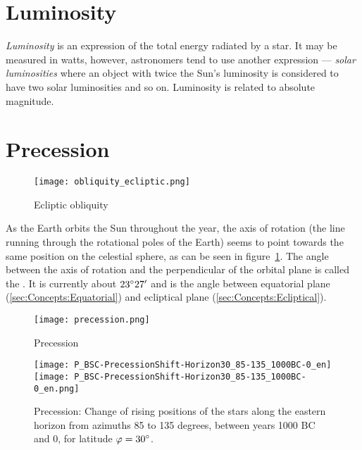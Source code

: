 \section{Luminosity}
\label{sec:Concepts:Luminosity}

\emph{Luminosity} is an expression of the total energy radiated by a
star. It may be measured in watts, however, astronomers tend to use
another expression --- \emph{solar luminosities} where an object with
twice the Sun's luminosity is considered to have two solar luminosities
and so on. Luminosity is related to absolute magnitude.

\section{Precession}
\label{sec:Concepts:Precession}

\begin{figure}[htb]
\centering\texttt{[image: obliquity\_ecliptic.png]}
\caption{Ecliptic obliquity}
\label{fig:Obliquity}
\end{figure}

\noindent As the Earth orbits the Sun throughout the year, the axis of rotation
(the line running through the rotational poles of the Earth) seems to
point towards the same position on the celestial sphere, as can be
seen in figure~\ref{fig:Obliquity}. The angle between the axis of
rotation and the perpendicular of the orbital plane is called the
. It is currently about
$23\degree27'$ and is the angle between equatorial plane
(\ref{sec:Concepts:Equatorial}) and ecliptical plane
(\ref{sec:Concepts:Ecliptical}).

\begin{figure}[p]
\centering\texttt{[image: precession.png]}
\caption{Precession}
\label{fig:Precession}
\end{figure}

\begin{figure}[p]
\centering
\ifpdf
\texttt{[image: P\_BSC-PrecessionShift-Horizon30\_85-135\_1000BC-0\_en]}
\else
\texttt{[image: P\_BSC-PrecessionShift-Horizon30\_85-135\_1000BC-0\_en.png]}
\fi
\caption{Precession: Change of rising positions of the stars along the
  eastern horizon from azimuths 85 to 135 degrees, between years 1000
  BC and 0, for latitude $\varphi=30\degree$.}
\label{fig:Precession:AzimuthShift}
\end{figure}





